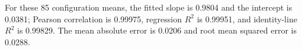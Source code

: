 For these 85 configuration means, the fitted slope is 0.9804 and the intercept is 0.0381; Pearson correlation is 0.99975, regression $R^2$ is 0.99951, and identity-line $R^2$ is 0.99829. The mean absolute error is 0.0206 and root mean squared error is 0.0288.
